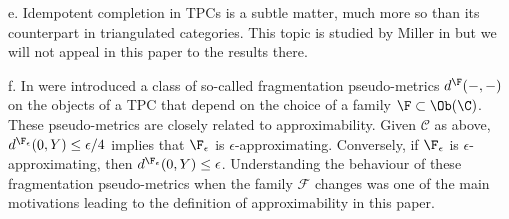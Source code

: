 \begin{rem}
e. Idempotent completion in TPCs is a subtle matter, much more so than its counterpart in triangulated categories. This topic is studied by Miller in \cite{Miller:idempotents} but we will not appeal in this paper to the results there.

 f. In \cite{BCZ:tpc} were introduced a class of so-called fragmentation pseudo-metrics $d^{\F}(-,-)$ on the objects of a TPC that depend on the choice of a family $\F\subset \Ob(\C)$. These pseudo-metrics are closely related to approximability.  Given $\mathscr{C}$ as above, $d^{\F_{\epsilon}}(0,Y)\leq \epsilon/4$ implies that  $\F_{\epsilon}$ is $\epsilon$-approximating. Conversely, if $\F_{\epsilon}$ is $\epsilon$-approximating, then $d^{\F_{\epsilon}}(0,Y)\leq \epsilon$.  Understanding the behaviour of these fragmentation pseudo-metrics when the family $\mathcal{F}$ changes was one of the main motivations leading to the definition of approximability in this paper. \end{rem}
  
 
